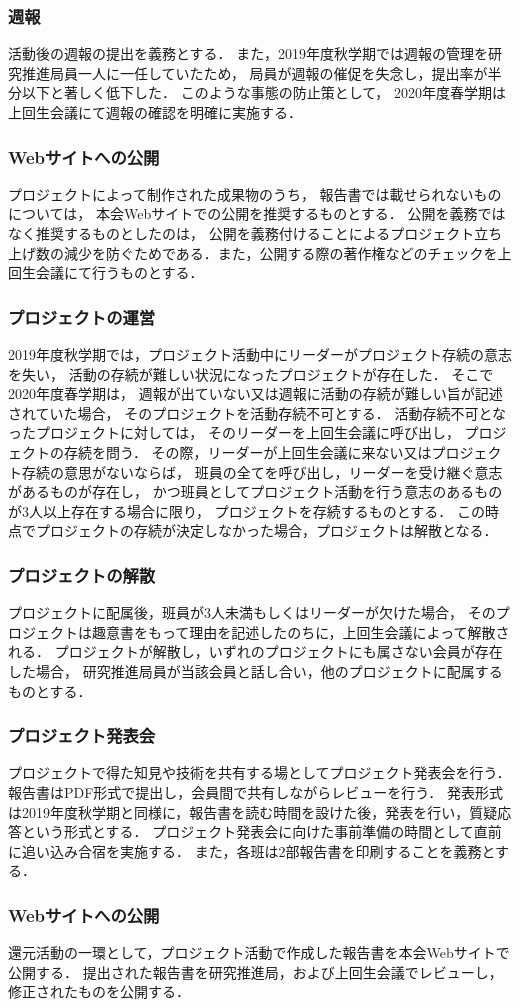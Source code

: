 \subsubsection*{週報}
活動後の週報の提出を義務とする．
また，2019年度秋学期では週報の管理を研究推進局員一人に一任していたため，
局員が週報の催促を失念し，提出率が半分以下と著しく低下した．
このような事態の防止策として，
2020年度春学期は上回生会議にて週報の確認を明確に実施する．

\subsubsection*{Webサイトへの公開}
プロジェクトによって制作された成果物のうち，
報告書では載せられないものについては，
本会Webサイトでの公開を推奨するものとする．
公開を義務ではなく推奨するものとしたのは，
公開を義務付けることによるプロジェクト立ち上げ数の減少を防ぐためである．また，公開する際の著作権などのチェックを上回生会議にて行うものとする．


\subsubsection*{プロジェクトの運営}
2019年度秋学期では，プロジェクト活動中にリーダーがプロジェクト存続の意志を失い，
活動の存続が難しい状況になったプロジェクトが存在した．
そこで2020年度春学期は，
週報が出ていない又は週報に活動の存続が難しい旨が記述されていた場合，
そのプロジェクトを活動存続不可とする．
活動存続不可となったプロジェクトに対しては，
そのリーダーを上回生会議に呼び出し，
プロジェクトの存続を問う．
その際，リーダーが上回生会議に来ない又はプロジェクト存続の意思がないならば，
班員の全てを呼び出し，リーダーを受け継ぐ意志があるものが存在し，
かつ班員としてプロジェクト活動を行う意志のあるものが3人以上存在する場合に限り，
プロジェクトを存続するものとする．
この時点でプロジェクトの存続が決定しなかった場合，プロジェクトは解散となる．

\subsubsection*{プロジェクトの解散}
プロジェクトに配属後，班員が3人未満もしくはリーダーが欠けた場合，
そのプロジェクトは趣意書をもって理由を記述したのちに，上回生会議によって解散される．
プロジェクトが解散し，いずれのプロジェクトにも属さない会員が存在した場合，
研究推進局員が当該会員と話し合い，他のプロジェクトに配属するものとする．

\subsubsection*{プロジェクト発表会}
プロジェクトで得た知見や技術を共有する場としてプロジェクト発表会を行う．
報告書はPDF形式で提出し，会員間で共有しながらレビューを行う．
発表形式は2019年度秋学期と同様に，報告書を読む時間を設けた後，発表を行い，質疑応答という形式とする．
プロジェクト発表会に向けた事前準備の時間として直前に追い込み合宿を実施する．
また，各班は2部報告書を印刷することを義務とする．

\subsubsection*{Webサイトへの公開}
還元活動の一環として，プロジェクト活動で作成した報告書を本会Webサイトで公開する．
提出された報告書を研究推進局，および上回生会議でレビューし，修正されたものを公開する．
